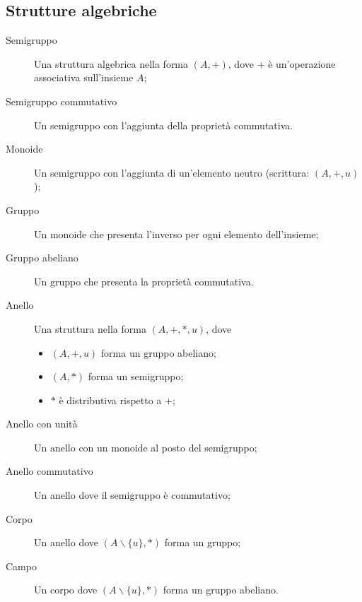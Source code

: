 \documentclass[10pt]{article}
\begin{document}
    \subsection*{Strutture algebriche}

        \begin{description}
            
            \item[Semigruppo] Una struttura algebrica nella forma \((A, +)\), dove \(+\) è un'operazione associativa sull'insieme \(A\);
            \item[Semigruppo commutativo] Un semigruppo con l'aggiunta della proprietà commutativa. 
            \item[Monoide] Un semigruppo con l'aggiunta di un'elemento neutro (scrittura: \((A, +, u)\));
            \item[Gruppo] Un monoide che presenta l'inverso per ogni elemento dell'insieme;
            \item[Gruppo abeliano] Un gruppo che presenta la proprietà commutativa.
            \item[Anello] Una struttura nella forma \((A, +, *, u)\), dove
                \begin{itemize}
                    \item \((A, +, u)\) forma un gruppo abeliano;
                    \item \((A, *)\) forma un semigruppo;
                    \item \(*\) è distributiva rispetto a \(+\);
                \end{itemize}
            \item[Anello con unità] Un anello con un monoide al posto del semigruppo;
            \item[Anello commutativo] Un anello dove il semigruppo è commutativo;
            \item[Corpo] Un anello dove \((A \backslash \{u\}, *)\) forma un gruppo;
            \item[Campo] Un corpo dove \((A \backslash \{u\}, *)\) forma un gruppo abeliano.

        \end{description}

\end{document}
